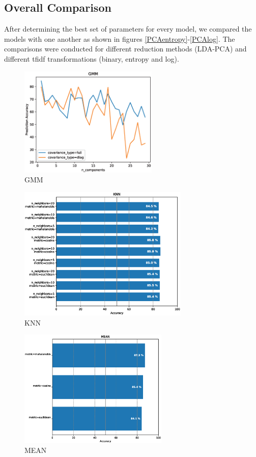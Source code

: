 \documentclass[10pt,journal,compsoc]{IEEEtran}
\begin{document}
\subsection{Overall Comparison}
After determining the best set of parameters
for every model, we compared the models 
with one another as shown in figures \ref{PCAentropy}-\ref{PCAlog}.
The comparisons were conducted for different reduction
methods (LDA-PCA) and different tfidf transformations
(binary, entropy and log).
\begin{figure}[!h]
	\centering
	\includegraphics[width=2.6in]{./img/GMM.eps}
	\caption{GMM}
	\label{GMM}
\end{figure}
\begin{figure}[!h]
	\centering
	\includegraphics[width=3.2in]{./img/KNN.eps}
	\caption{KNN}
	\label{KNN}
\end{figure}
\begin{figure}[!h]
	\centering
	\includegraphics[width=2.8in]{./img/MEAN.eps}
	\caption{MEAN}
	\label{MEAN}
\end{figure}
\end{document}
